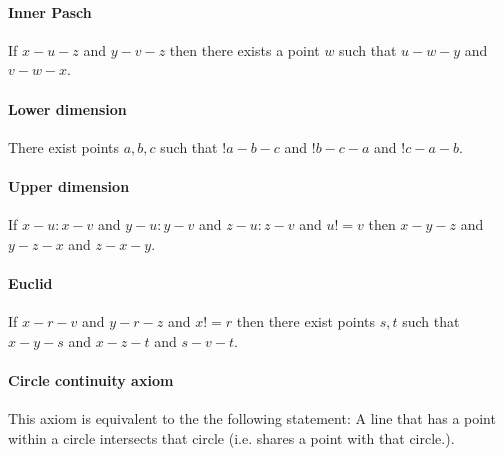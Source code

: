 \documentclass{article}
\begin{document}
  \paragraph{Inner Pasch}

  \begin{forthel}
    \begin{axiom}[A7]
      If $x-u-z$ and $y-v-z$ then there exists a point $w$ such that $u-w-y$ and $v-w-x$.
    \end{axiom}
  \end{forthel}


  \paragraph{Lower dimension}

  \begin{forthel}
    \begin{axiom}[A8]
      There exist points $a,b,c$ such that $!a-b-c$ and $!b-c-a$ and $!c-a-b$.
    \end{axiom}
  \end{forthel}


  \paragraph{Upper dimension}

  \begin{forthel}
    \begin{axiom}[A9]
      If $x-u : x-v$ and $y-u : y-v$ and $z-u : z-v$ and $u != v$ then $x-y-z$ and $y-z-x$ and $z-x-y$.
    \end{axiom}
  \end{forthel}


  \paragraph{Euclid}

  \begin{forthel}
    \begin{axiom}[A10]
      If $x-r-v$ and $y-r-z$ and $x != r$ then there exist points $s,t$ such that $x-y-s$ and $x-z-t$ and $s-v-t$.
    \end{axiom}
  \end{forthel}


  \paragraph{Circle continuity axiom} This axiom is equivalent to the the following statement: A line that has a point within a circle intersects that circle (i.e. shares a point with that circle.).
\end{document}
